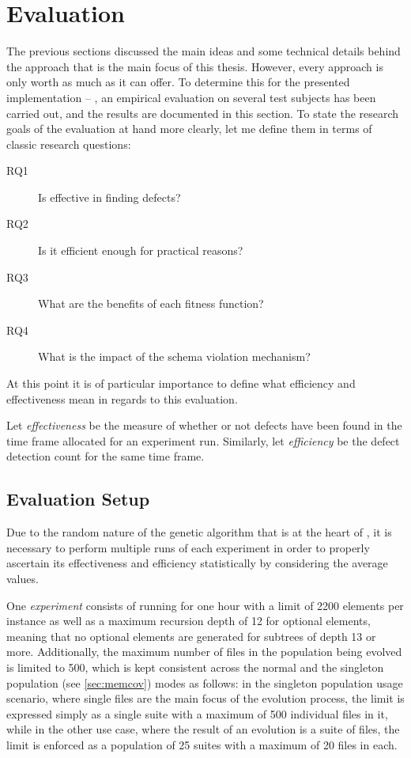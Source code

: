 \section{Evaluation}
\label{sec:evaluation}
The previous sections discussed the main ideas and some technical details behind
the approach that is the main focus of this thesis. However, every approach is only worth as much as it can
offer. To determine this for the presented implementation -- \xmlmate, an empirical evaluation on several test
subjects has been carried out, and the results are documented in this section.
To state the research goals of the evaluation at hand more clearly, let me define them in terms of classic
research questions:
\begin{description}
  \item[RQ1] Is \xmlmate effective in finding defects?
  \item[RQ2] Is it efficient enough for practical reasons?
  \item[RQ3] What are the benefits of each fitness function?
  \item[RQ4] What is the impact of the schema violation mechanism?
\end{description}

At this point it is of particular importance to define what efficiency and
effectiveness mean in regards to this evaluation. 

Let \emph{effectiveness} be the measure of whether or not defects have been found in the time frame allocated
for an experiment run. Similarly, let \emph{efficiency} be the defect detection count for the same time frame.

\subsection{Evaluation Setup}
Due to the random nature of the genetic algorithm that is at the heart of \xmlmate, it is necessary to perform
multiple runs of each experiment in order to properly ascertain its effectiveness and efficiency statistically
by considering the average values.

One \emph{experiment} consists of running \xmlmate for one hour with a limit of 2200 elements per \xml instance
as well as a maximum recursion depth of 12 for optional elements, meaning that no optional elements are generated
for subtrees of depth 13 or more. Additionally, the maximum number of \xml files in the population being
evolved is limited to 500, which is kept consistent across the normal and the singleton population (see
\cref{sec:memcov}) modes as follows: in the singleton population usage scenario, where single files are the
main focus of the evolution process, the limit is expressed simply as a single suite with a maximum of 500
individual files in it, while in the other use case, where the result of an evolution is a suite of files, the
limit is enforced as a population of 25 suites with a maximum of 20 files in each.

